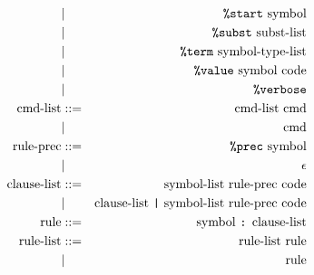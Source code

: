 \begin{eqnarray*}
 & | & \mbox{{\tt \%start} symbol} \\
 & | & \mbox{{\tt \%subst} subst-list} \\
 & | & \mbox{{\tt \%term} symbol-type-list} \\
 & | & \mbox{{\tt \%value} symbol code} \\
 & | & \mbox{{\tt \%verbose}} \\
\mbox{cmd-list} & ::= &\mbox{ cmd-list cmd} \\
 & | & \mbox{cmd} \\
\mbox{rule-prec} & ::= & \mbox{{\tt \%prec} symbol} \\
            &  | & \epsilon \\
\mbox{clause-list} & ::= & \mbox{symbol-list rule-prec code} \\
              &  | &  \mbox{clause-list {\tt |} symbol-list rule-prec code} \\
\mbox{rule} & ::= & \mbox{symbol {\tt :} clause-list} \\
\mbox{rule-list} & ::= & \mbox{rule-list rule} \\
            &  |  & \mbox{rule} 
\end{eqnarray*}
